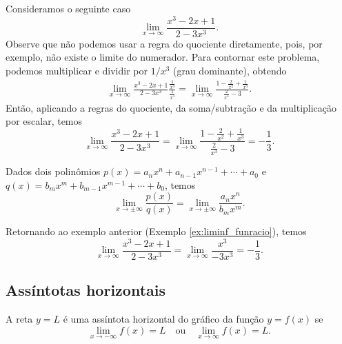\begin{ex}\label{ex:liminf_funracio}
  Consideramos o seguinte caso
  \begin{equation}
    \lim_{x\to \infty} \frac{x^3 - 2x + 1}{2 - 3x^3}.
  \end{equation}
  Observe que não podemos usar a regra do quociente diretamente, pois, por exemplo, não existe o limite do numerador. Para contornar este problema, podemos multiplicar e dividir por $1/x^3$ (grau dominante), obtendo
  \begin{align}
    \lim_{x\to\infty} \frac{x^3 - 2x + 1}{2 - 3x^3}\frac{\frac{1}{x^3}}{\frac{1}{x^3}} = \lim_{x\to\infty} \frac{1-\frac{2}{x^2} + \frac{1}{x^3}}{\frac{2}{x^3}-3}. 
  \end{align}
  Então, aplicando a regras do quociente, da soma/subtração e da multiplicação por escalar, temos
  \begin{equation}
    \lim_{x\to\infty} \frac{x^3 - 2x + 1}{2 - 3x^3} = \lim_{x\to\infty} \frac{1-\frac{2}{x^2} + \frac{1}{x^3}}{\frac{2}{x^3}-3} = -\frac{1}{3}.
  \end{equation}
\end{ex}

\begin{obs}
  Dados dois polinômios $p(x) = a_nx^n+a_{n-1}x^{n-1}+\cdots + a_0$ e $q(x) = b_mx^m+b_{m-1}x^{m-1}+\cdots + b_0$, temos
  \begin{equation}
    \lim_{x\to \pm\infty} \frac{p(x)}{q(x)} = \lim_{x\to\pm\infty} \frac{a_nx^n}{b_mx^m}.
  \end{equation}
\end{obs}

\begin{ex}
  Retornando ao exemplo anterior (Exemplo \ref{ex:liminf_funracio}), temos
  \begin{equation}
    \lim_{x\to\infty} \frac{x^3 - 2x + 1}{2 - 3x^3} = \lim_{x\to\infty} \frac{x^3}{-3x^3} = -\frac{1}{3}.
  \end{equation}
\end{ex}

\subsection{Assíntotas horizontais}

A reta $y = L$ é uma assíntota horizontal do gráfico da função $y = f(x)$ se
\begin{equation}
  \lim_{x\to -\infty} f(x) = L\quad\text{ou}\quad\lim_{x\to\infty} f(x) = L.
\end{equation}

